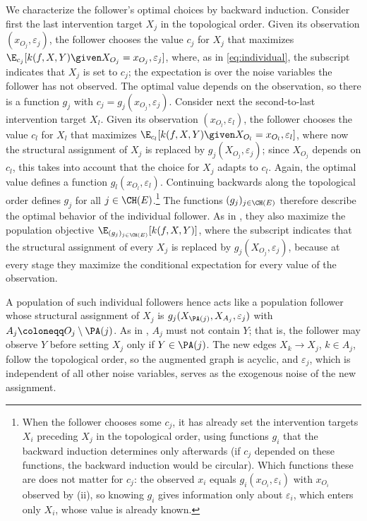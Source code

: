 {We characterize the follower's optimal choices by backward induction.
Consider first the last intervention target $X_j$ in the topological order.
Given its observation $(x_{O_j}, \varepsilon_j)$, the follower chooses the value $c_j$ for $X_j$ that maximizes $\E_{c_j}[k(f, X, Y) \given X_{O_j} = x_{O_j}, \varepsilon_j]$, where, as in \eqref{eq:individual}, the subscript indicates that $X_j$ is set to $c_j$; the expectation is over the noise variables the follower has not observed.
The optimal value depends on the observation, so there is a function $g_j$ with $c_j = g_j(x_{O_j}, \varepsilon_j)$.
Consider next the second-to-last intervention target $X_l$.
Given its observation $(x_{O_l}, \varepsilon_l)$, the follower chooses the value $c_l$ for $X_l$ that maximizes $\E_{c_l}[k(f, X, Y) \given X_{O_l} = x_{O_l}, \varepsilon_l]$, where now the structural assignment of $X_j$ is replaced by $g_j(X_{O_j}, \varepsilon_j)$; since $X_{O_j}$ depends on $c_l$, this takes into account that the choice for $X_j$ adapts to $c_l$.
Again, the optimal value defines a function $g_l(x_{O_l}, \varepsilon_l)$.
Continuing backwards along the topological order defines $g_j$ for all $j \in \CH(E)$.\footnote{When the follower chooses some $c_j$, it has already set the intervention targets $X_i$ preceding $X_j$ in the topological order, using functions $g_i$ that the backward induction determines only afterwards (if $c_j$ depended on these functions, the backward induction would be circular).
Which functions these are does not matter for $c_j$: the observed $x_i$ equals $g_i(x_{O_i}, \varepsilon_i)$ with $x_{O_i}$ observed by (ii), so knowing $g_i$ gives information only about $\varepsilon_i$, which enters only $X_i$, whose value is already known.}
The functions $(g_j)_{j \in \CH(E)}$ therefore describe the optimal behavior of the individual follower.
As in , they also maximize the population objective $\E_{(g_j)_{j \in \CH(E)}}[k(f, X, Y)]$, where the subscript indicates that the structural assignment of every $X_j$ is replaced by $g_j(X_{O_j}, \varepsilon_j)$, because at every stage they maximize the conditional expectation for every value of the observation.

A population of such individual followers hence acts like a population follower whose structural assignment of $X_j$ is $g_j(X_{\PA(j)}, X_{A_j}, \varepsilon_j)$ with $A_j \coloneqq O_j \setminus \PA(j)$.
As in , $A_j$ must not contain $Y$; that is, the follower may observe $Y$ before setting $X_j$ only if $Y \in \PA(j)$.
The new edges $X_k \to X_j$, $k \in A_j$, follow the topological order, so the augmented graph is acyclic, and $\varepsilon_j$, which is independent of all other noise variables, serves as the exogenous noise of the new assignment.}

